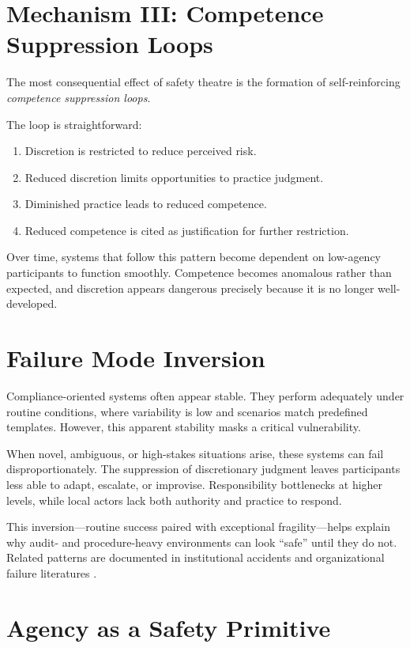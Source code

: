 \documentclass[11pt]{article}
\begin{document}
\section{Mechanism III: Competence Suppression Loops}

The most consequential effect of safety theatre is the formation of self-reinforcing
\emph{competence suppression loops}.

The loop is straightforward:

\begin{enumerate}
  \item Discretion is restricted to reduce perceived risk.
  \item Reduced discretion limits opportunities to practice judgment.
  \item Diminished practice leads to reduced competence.
  \item Reduced competence is cited as justification for further restriction.
\end{enumerate}

Over time, systems that follow this pattern become dependent on low-agency participants
to function smoothly. Competence becomes anomalous rather than expected, and discretion
appears dangerous precisely because it is no longer well-developed.

\section{Failure Mode Inversion}

Compliance-oriented systems often appear stable. They perform adequately under routine
conditions, where variability is low and scenarios match predefined templates. However,
this apparent stability masks a critical vulnerability.

When novel, ambiguous, or high-stakes situations arise, these systems can fail
disproportionately. The suppression of discretionary judgment leaves participants less
able to adapt, escalate, or improvise. Responsibility bottlenecks at higher levels,
while local actors lack both authority and practice to respond.

This inversion---routine success paired with exceptional fragility---helps explain why
audit- and procedure-heavy environments can look ``safe'' until they do not. Related
patterns are documented in institutional accidents and organizational failure
literatures \citep{Vaughan1996Challenger,Perrow1984Normal}.

\section{Agency as a Safety Primitive}
\end{document}
